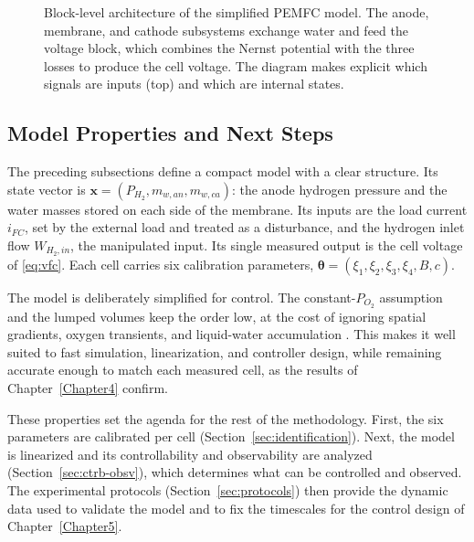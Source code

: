 \begin{figure}[t]
{%
}
\caption[Block-level architecture of the simplified PEMFC model]{Block-level
         architecture of the simplified PEMFC model. The anode, membrane, and
         cathode subsystems exchange water and feed the voltage block, which
         combines the Nernst potential with the three losses to produce the cell
         voltage. The diagram makes explicit which signals are inputs (top) and
         which are internal states.}
\label{fig:architecture}
\end{figure}

\subsection{Model Properties and Next Steps}
\label{sec:model-properties}

The preceding subsections define a compact model with a clear structure. Its
state vector is $\mathbf{x}=(P_{H_2},m_{w,an},m_{w,ca})$: the anode hydrogen
pressure and the water masses stored on each side of the membrane. Its inputs are
the load current $i_{FC}$, set by the external load and treated as a disturbance,
and the hydrogen inlet flow $W_{H_2,in}$, the manipulated input. Its single
measured output is the cell voltage of \eqref{eq:vfc}. Each cell carries six
calibration parameters, $\boldsymbol{\theta}=(\xi_1,\xi_2,\xi_3,\xi_4,B,c)$.

The model is deliberately simplified for control. The constant-$P_{O_2}$
assumption and the lumped volumes keep the order low, at the cost of ignoring
spatial gradients, oxygen transients, and liquid-water accumulation
\cite{weber2004,zhang2017}. This makes it well suited to fast simulation,
linearization, and controller design, while remaining accurate enough to match
each measured cell, as the results of Chapter~\ref{Chapter4} confirm.

These properties set the agenda for the rest of the methodology. First, the six
parameters are calibrated per cell (Section~\ref{sec:identification}). Next, the
model is linearized and its controllability and observability are analyzed
(Section~\ref{sec:ctrb-obsv}), which determines what can be controlled and
observed. The experimental protocols (Section~\ref{sec:protocols}) then provide
the dynamic data used to validate the model and to fix the timescales for the
control design of Chapter~\ref{Chapter5}.

